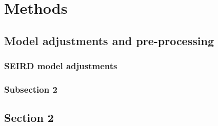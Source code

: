 
\chapter{Methods} %

\label{chap:methods} %


\section{Model adjustments and pre-processing}

\subsection{SEIRD model adjustments}
\label{sec:SEIRDredef}


\subsection{Subsection 2}


\section{Section 2}

